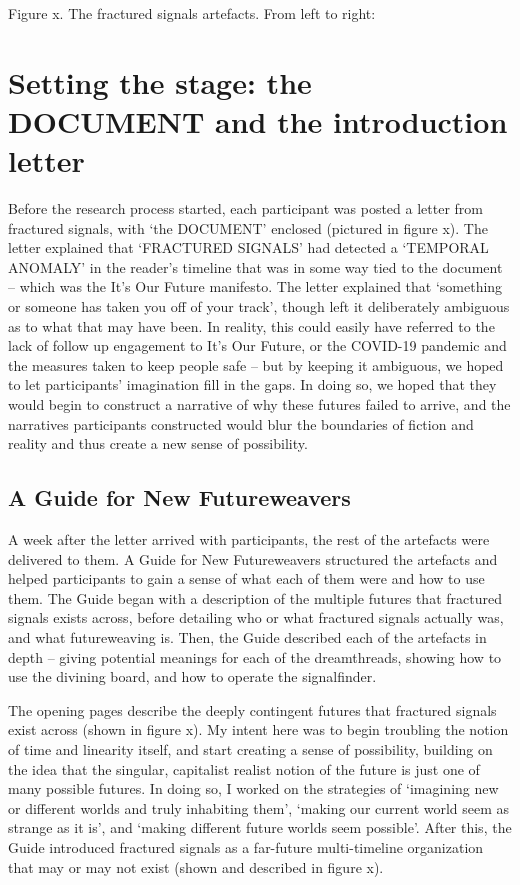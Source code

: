 Figure x. The fractured signals artefacts. From left to right: 

\section{Setting the stage: the DOCUMENT and the introduction letter}

Before the research process started, each participant was posted a letter from fractured signals, with ‘the DOCUMENT’ enclosed (pictured in figure x). The letter explained that ‘FRACTURED SIGNALS’ had detected a ‘TEMPORAL ANOMALY’ in the reader’s timeline that was in some way tied to the document – which was the It’s Our Future manifesto. The letter explained that ‘something or someone has taken you off of your track’, though left it deliberately ambiguous as to what that may have been. In reality, this could easily have referred to the lack of follow up engagement to It’s Our Future, or the COVID-19 pandemic and the measures taken to keep people safe – but by keeping it ambiguous, we hoped to let participants’ imagination fill in the gaps. In doing so, we hoped that they would begin to construct a narrative of why these futures failed to arrive, and the narratives participants constructed would blur the boundaries of fiction and reality and thus create a new sense of possibility. 


\subsection{A Guide for New Futureweavers}

A week after the letter arrived with participants, the rest of the artefacts were delivered to them. A Guide for New Futureweavers structured the artefacts and helped participants to gain a sense of what each of them were and how to use them. The Guide began with a description of the multiple futures that fractured signals exists across, before detailing who or what fractured signals actually was, and what futureweaving is. Then, the Guide described each of the artefacts in depth – giving potential meanings for each of the dreamthreads, showing how to use the divining board, and how to operate the signalfinder. 

The opening pages describe the deeply contingent futures that fractured signals exist across (shown in figure x).  My intent here was to begin troubling the notion of time and linearity itself, and start creating a sense of possibility, building on the idea that the singular, capitalist realist notion of the future is just one of many possible futures. In doing so, I worked on the strategies of ‘imagining new or different worlds and truly inhabiting them’, ‘making our current world seem as strange as it is’, and ‘making different future worlds seem possible’.  After this, the Guide introduced fractured signals as a far-future multi-timeline organization that may or may not exist (shown and described in figure x).

